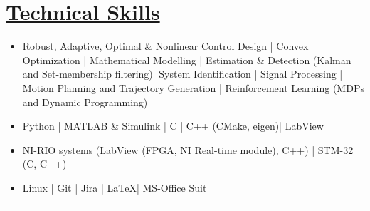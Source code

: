 \section*{\underline{Technical Skills}}
\begin{itemize}
        \item[\itbf{Control and Estimation:}] Robust, Adaptive, Optimal \& Nonlinear Control Design |
        Convex Optimization | Mathematical Modelling |
        Estimation \& Detection (Kalman and Set-membership filtering)|
        System Identification | Signal Processing |
        Motion Planning and Trajectory Generation |
        Reinforcement Learning (MDPs and Dynamic Programming)
        \item[\itbf{Programming:}] Python | MATLAB \& Simulink | C | C++ (CMake, eigen)| LabView
        \item[\itbf{Embedded Systems:}] NI-RIO systems (LabView (FPGA, NI Real-time module), C++) | STM-32 (C, C++)
        \item[\itbf{OS \& Tools:}] Linux | Git | Jira | \LaTeX | MS-Office Suit
\end{itemize}
\noindent\rule{\textwidth}{0.4pt}
